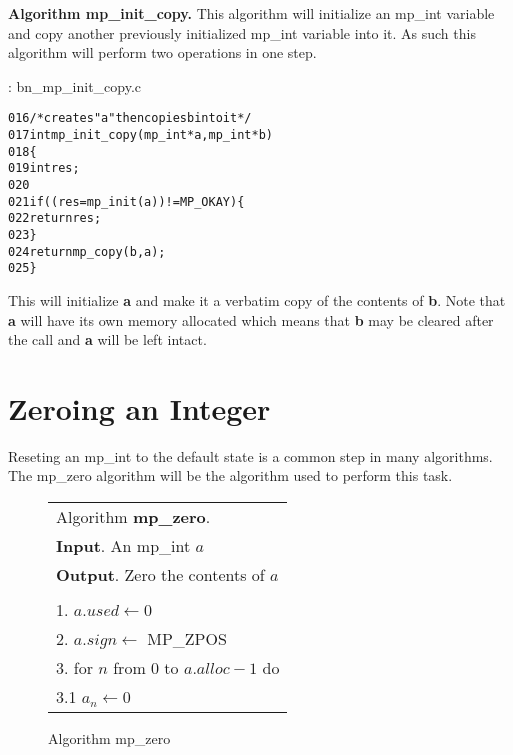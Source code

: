 \documentclass[b5paper]{book}
\begin{document}
\textbf{Algorithm mp\_init\_copy.}
This algorithm will initialize an mp\_int variable and copy another previously initialized mp\_int variable into it.  As 
such this algorithm will perform two operations in one step.  

\vspace{+3mm}\begin{small}
\hspace{-5.1mm}{\bf File}: bn\_mp\_init\_copy.c
\vspace{-3mm}
\begin{alltt}
016   /* creates "a" then copies b into it */
017   int mp_init_copy (mp_int * a, mp_int * b)
018   \{
019     int     res;
020   
021     if ((res = mp_init (a)) != MP_OKAY) \{
022       return res;
023     \}
024     return mp_copy (b, a);
025   \}
\end{alltt}
\end{small}

This will initialize \textbf{a} and make it a verbatim copy of the contents of \textbf{b}.  Note that 
\textbf{a} will have its own memory allocated which means that \textbf{b} may be cleared after the call
and \textbf{a} will be left intact.  

\section{Zeroing an Integer}
Reseting an mp\_int to the default state is a common step in many algorithms.  The mp\_zero algorithm will be the algorithm used to
perform this task.

\begin{figure}[here]
\begin{center}
\begin{tabular}{l}
\hline Algorithm \textbf{mp\_zero}. \\
\textbf{Input}.   An mp\_int $a$ \\
\textbf{Output}.  Zero the contents of $a$ \\
\hline \\
1.  $a.used \leftarrow 0$ \\
2.  $a.sign \leftarrow$ MP\_ZPOS \\
3.  for $n$ from 0 to $a.alloc - 1$ do \\
\hspace{3mm}3.1  $a_n \leftarrow 0$ \\
\hline
\end{tabular}
\end{center}
\caption{Algorithm mp\_zero}
\end{figure}
\end{document}
